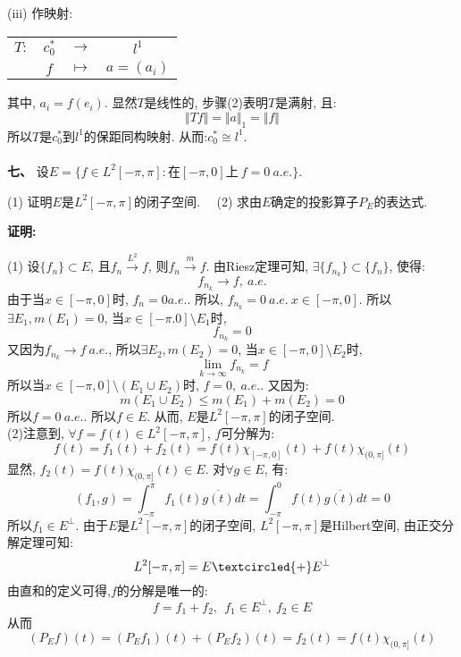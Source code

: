 \documentclass{article}
\begin{document}
(iii) 作映射:
\begin{center}
\begin{tabular}{cccc}
$T:$ &  $c_0^*$ & $\longrightarrow$ &  $l^1$ \\
     &   $f$    &  $\longmapsto$   &  $a=(a_i)$     \\
\end{tabular}
\end{center} 
其中, $a_i = f(e_i)$. 显然$T$是线性的, 步骤(2)表明$T$是满射, 且:
$$ \Vert Tf \Vert = \Vert a \Vert_1 = \Vert f \Vert $$
所以$T$是$c_0^*$到$l^1$的保距同构映射. 从而:$c_0^* \cong l^1$. \\  \\


\textbf{七、} 设$E = \{ f \in L^2[-\pi, \pi]: \text{在}[-\pi, 0]\text{上}\ f=0 \ a.e. \}$.

\hspace{2em} (1) 证明$E$是$L^2[-\pi, \pi]$的闭子空间. \ \ (2) 求由$E$确定的投影算子$P_E$的表达式. 

\textbf{证明:}

(1) 设$\{f_n \} \subset E$, 且$f_n \xrightarrow{L^2} f$, 则$ f_n \xrightarrow{m} f$. 由Riesz定理可知, $\exists \{ f_{n_k} \} \subset \{f_n \}$, 使得:
$$ f_{n_k} \rightarrow f, \ a.e. $$
由于当$x \in [-\pi,0]$时, $f_n = 0 a.e. $. 所以, $f_{n_k} = 0 \ a.e. \ x \in [-\pi, 0] $. 所以$\exists E_1, m(E_1) =0$, 当$x \in [-\pi.0] \setminus E_1$时,
$$ f_{n_k} = 0 $$
又因为$f_{n_k} \rightarrow f \ a.e.$, 所以$\exists E_2, m(E_2)=0$, 当$x \in [-\pi,0] \setminus E_2$时,
$$ \lim\limits_{k \rightarrow \infty} f_{n_k} = f $$
所以当$x \in [-\pi, 0] \setminus (E_1 \cup E_2)$时, $f = 0, \ a.e.$. 又因为:
$$ m(E_1 \cup E_2) \leq m(E_1) + m(E_2) = 0 $$
所以$f = 0 \ a.e.$. 所以$f \in E$. 从而, $E$是$L^2[-\pi, \pi]$的闭子空间. \\

(2)注意到, $\forall f=f(t) \in L^2[-\pi, \pi]$, $f$可分解为:
$$ f(t) = f_1(t) + f_2(t) = f(t)\chi_{[-\pi,0]}(t) + f(t)\chi_{(0,\pi]}(t) $$
显然, $f_2(t)=f(t)\chi_{(0,\pi]}(t) \in E$. 对$\forall g \in E$, 有:
$$ (f_1, g) = \int_{-\pi}^{\pi} f_1(t)\overline{g(t)}dt = \int_{-\pi}^{0}f(t)\overline{g(t)}dt=0 $$
所以$f_1 \in E^{\perp}$. 由于$E$是$L^2[-\pi, \pi]$的闭子空间, $L^2[-\pi, \pi]$是Hilbert空间, 由正交分解定理可知:
$$ L^2[-\pi, \pi] = E \textcircled{+} E^{\perp} $$
由直和的定义可得,$f$的分解是唯一的:
$$ f = f_1 + f_2, \ \ f_1 \in E^{\perp}, \ f_2 \in E $$
从而
$$ (P_Ef)(t) = (P_Ef_1)(t) + (P_Ef_2)(t) = f_2(t) = f(t)\chi_{(0,\pi]}(t) $$

\newpage
\end{document}
